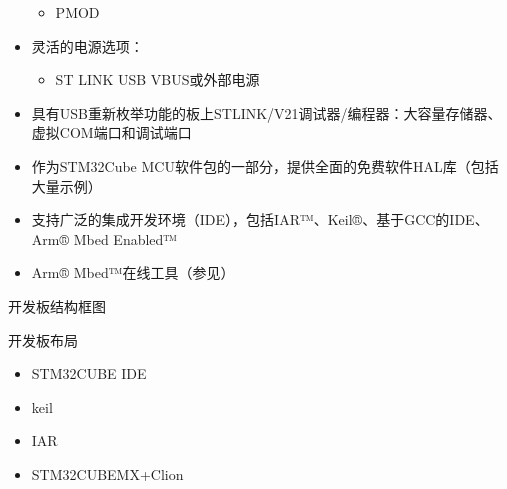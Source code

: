 \documentclass[a4paper,12pt,english]{sphinxmanual}
\begin{document}
\begin{itemize}
\begin{itemize}
\item {} 
\sphinxAtStartPar
PMOD

\end{itemize}

\item {} 
\sphinxAtStartPar
灵活的电源选项：
\begin{itemize}
\item {} 
\sphinxAtStartPar
ST LINK USB VBUS或外部电源

\end{itemize}

\item {} 
\sphinxAtStartPar
具有USB重新枚举功能的板上ST\sphinxhyphen{}LINK/V2\sphinxhyphen{}1调试器/编程器：大容量存储器、虚拟COM端口和调试端口

\item {} 
\sphinxAtStartPar
作为STM32Cube MCU软件包的一部分，提供全面的免费软件HAL库（包括大量示例）

\item {} 
\sphinxAtStartPar
支持广泛的集成开发环境（IDE），包括IAR™、Keil®、基于GCC的IDE、Arm® Mbed Enabled™

\item {} 
\sphinxAtStartPar
Arm® Mbed™在线工具（参见）

\end{itemize}

\sphinxAtStartPar
开发板结构框图

\sphinxAtStartPar
{}

\sphinxAtStartPar
开发板布局

\sphinxAtStartPar
{}

\sphinxAtStartPar
{}

\sphinxAtStartPar
{}

\sphinxAtStartPar
{}

\sphinxAtStartPar
{}
\begin{itemize}
\item {} 
\sphinxAtStartPar
STM32CUBE IDE

\item {} 
\sphinxAtStartPar
keil

\item {} 
\sphinxAtStartPar
IAR

\item {} 
\sphinxAtStartPar
STM32CUBEMX+Clion

\end{itemize}
\end{document}
